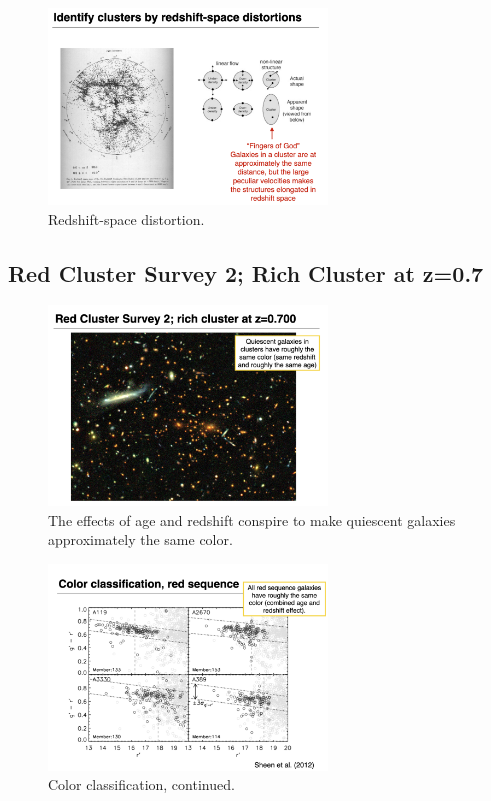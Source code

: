 \documentclass{article}
\begin{document}
\begin{figure}
    \centering
    \includegraphics[width=0.66\textwidth]{figs/Screen Shot 2021-10-29 at 10.29.33 AM.png}
    \caption{Redshift-space distortion.}
    \label{fig:redshfit_space_Distortion}
\end{figure}

\subsection{Red Cluster Survey 2; Rich Cluster at z=0.7}

\begin{figure}
    \centering
    \includegraphics[width=0.66\textwidth]{figs/Screen Shot 2021-10-29 at 10.31.12 AM.png}
    \caption{The effects of age and redshift conspire to make quiescent galaxies approximately the same color. }
    \label{fig:asdasdasdsaasdddas}
\end{figure}

\begin{figure}
    \centering
    \includegraphics[width=0.66\textwidth]{figs/Screen Shot 2021-10-29 at 10.32.38 AM.png}
    \caption{Color classification, continued. }
    \label{fig:colocoors}
\end{figure}
\end{document}
